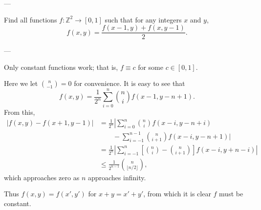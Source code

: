 
---

Find all functions $f:\mathbb Z^2\to[0,1]$ such that for any integers $x$ and $y$, \[f(x,y)=\frac{f(x-1,y)+f(x,y-1)}2.\]

---

Only constant functions work; that is, $f\equiv c$ for some $c\in[0,1]$.

Here we let $\binom n{-1}=0$ for convenience. It is easy to see that \[f(x,y)=\frac1{2^n}\sum_{i=0}^n\binom nif(x-1,y-n+1).\]
From this,
\begin{align*}
    \Big\lvert f(x,y)-f(x+1,y-1)\Big\rvert&=\frac1{2^n}\left\lvert\sum_{i=0}^n\binom nif(x-i,y-n+i)\\
    &\qquad-\sum_{i=-1}^{n-1}\binom n{i+1}f(x-i,y-n+1)\Big\rvert\\
    &=\frac1{2^n}\left\lvert\sum_{i=-1}^n\left[\binom ni-\binom n{i+1}\right]f(x-i,y+n-i)\right\rvert\\
    &\le\frac1{2^{n-1}}\binom n{\lfloor n/2\rfloor},
\end{align*}
which approaches zero as $n$ approaches infinity.

Thus $f(x,y)=f(x',y')$ for $x+y=x'+y'$, from which it is clear $f$ must be constant.

